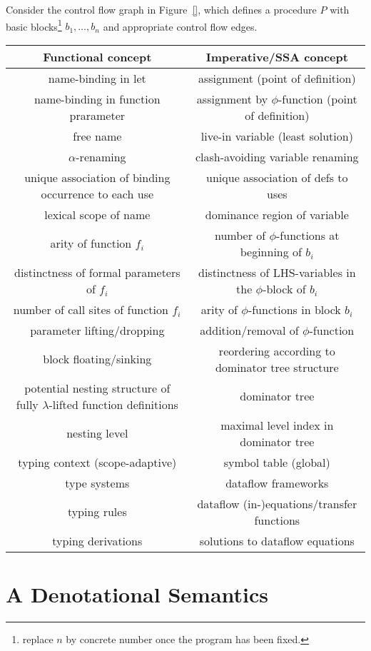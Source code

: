 Consider the control flow graph in Figure~\ref{}, which defines a
procedure $P$ with basic blocks\footnote{replace $n$ by concrete
number once the program has been fixed.} $b_1,\ldots,b_n$ and
appropriate control flow edges. 

\begin{tabular}{|c|c|}
  \hline Functional concept & Imperative/SSA concept\\ \hline \hline
  name-binding in let & assignment (point of definition)\\
  name-binding in function prarameter & assignment by $\phi$-function
  (point of definition)\\ free name & live-in variable (least
  solution)\\ $\alpha$-renaming & clash-avoiding variable renaming\\
  unique association of binding occurrence to each use & unique
  association of defs to uses\\ lexical scope of name & dominance
  region of variable\\ arity of function $f_i$ & number of
  $\phi$-functions at beginning of $b_i$\\ distinctness of formal
  parameters of $f_i$ & distinctness of LHS-variables in the
  $\phi$-block of $b_i$\\ number of call sites of function $f_i$ &
  arity of $\phi$-functions in block $b_i$\\ parameter
  lifting/dropping & addition/removal of $\phi$-function\\ block
  floating/sinking & reordering according to dominator tree
  structure\\ potential nesting structure of fully $\lambda$-lifted
  function definitions & dominator tree\\ nesting level & maximal
  level index in dominator tree\\ typing context (scope-adaptive) &
  symbol table (global)\\ type systems & dataflow frameworks\\ typing
  rules & dataflow (in-)equations/transfer functions\\ typing
  derivations & solutions to dataflow equations\\ \hline
\end{tabular}


\section{A Denotational Semantics}
\label{section:Part1:Semantics:PopSemantics}

